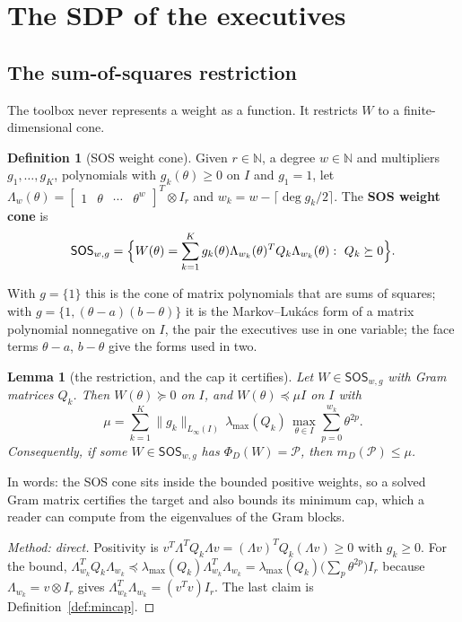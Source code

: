 \documentclass[12pt]{article}
\newcommand{\N}{\mathbb{N}}
\newcommand{\mcl}[1]{\mathcal{#1}}
\newcommand{\bmat}[1]{\begin{bmatrix} #1 \end{bmatrix}}
\newcommand{\SOS}{\mathsf{SOS}}
\theoremstyle{plain}
\newtheorem{lemma}[theorem]{Lemma}
\theoremstyle{definition}
\newtheorem{definition}[theorem]{Definition}
\theoremstyle{remark}
\begin{document}
\section{The SDP of the executives}\label{sec:sdp}

\subsection{The sum-of-squares restriction}

The toolbox never represents a weight as a function. It restricts $W$ to a finite-dimensional cone.

\begin{definition}[SOS weight cone]\label{def:sos}
Given $r\in\N$, a degree $w\in\N$ and multipliers $g_1,\dots,g_K$, polynomials with $g_k(\theta)\ge0$ on $I$ and $g_1=1$, let $\Lambda_w(\theta)=\bmat{1&\theta&\cdots&\theta^w}^T\otimes I_r$ and $w_k=w-\lceil\deg g_k/2\rceil$. The \textbf{SOS weight cone} is
\[
\SOS_{w,g}=\Bigl\{W(\theta)=\sum_{k=1}^Kg_k(\theta)\Lambda_{w_k}(\theta)^TQ_k\Lambda_{w_k}(\theta):\ Q_k\succeq0\Bigr\}.
\]
\end{definition}
With $g=\{1\}$ this is the cone of matrix polynomials that are sums of squares; with $g=\{1,(\theta-a)(b-\theta)\}$ it is the Markov--Luk\'acs form of a matrix polynomial nonnegative on $I$, the pair the executives use in one variable; the face terms $\theta-a$, $b-\theta$ give the forms used in two.

\begin{lemma}[the restriction, and the cap it certifies]\label{lem:soscap}
Let $W\in\SOS_{w,g}$ with Gram matrices $Q_k$. Then $W(\theta)\succeq0$ on $I$, and $W(\theta)\preceq\mu I$ on $I$ with
\[
\mu=\sum_{k=1}^K\|g_k\|_{L_\infty(I)}\,\lambda_{\max}(Q_k)\,\max_{\theta\in I}\sum_{p=0}^{w_k}\theta^{2p}.
\]
Consequently, if some $W\in\SOS_{w,g}$ has $\Phi_D(W)=\mcl P$, then $m_D(\mcl P)\le\mu$.
\end{lemma}
In words: the SOS cone sits inside the bounded positive weights, so a solved Gram matrix certifies the target and also bounds its minimum cap, which a reader can compute from the eigenvalues of the Gram blocks.
\begin{proof}[Method: direct]
Positivity is $v^T\Lambda^TQ_k\Lambda v=(\Lambda v)^TQ_k(\Lambda v)\ge0$ with $g_k\ge0$. For the bound, $\Lambda_{w_k}^TQ_k\Lambda_{w_k}\preceq\lambda_{\max}(Q_k)\Lambda_{w_k}^T\Lambda_{w_k}=\lambda_{\max}(Q_k)\bigl(\sum_p\theta^{2p}\bigr)I_r$ because $\Lambda_{w_k}=v\otimes I_r$ gives $\Lambda_{w_k}^T\Lambda_{w_k}=(v^Tv)I_r$. The last claim is Definition~\ref{def:mincap}.
\end{proof}
\end{document}
